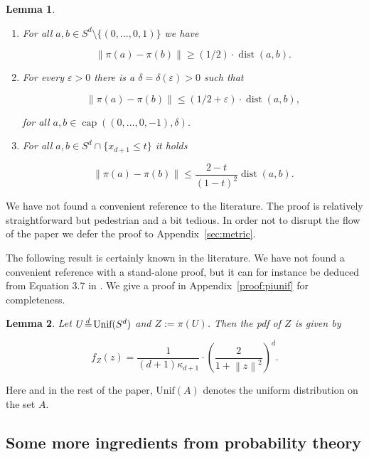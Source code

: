 \documentclass[11pt]{article}%
\newtheorem{lemma}[lemma]{Lemma}
\newcommand{\norm}[1]{\ensuremath{\left\|#1\right\|}}
\newcommand{\isd}[0]{\hspace{.2ex} \raisebox{-.1ex}{$=$} \hspace{-1.5ex} 
\raisebox{1ex}{{$\scriptstyle d$}} \hspace{.8ex} }
\newcommand{\eps}{\varepsilon}
\DeclareMathOperator{\dist}{dist}
\DeclareMathOperator{\kap}{cap}
\begin{document}
\begin{lemma}\label{lem:metric}
$\text{ }$
\begin{enumerate}
 \item\label{itm:metricgenlb} For all $a, b \in S^d \setminus \{(0,\dots,0,1)\}$ we have 
 
 $$ \norm{\pi(a)-\pi(b)} \geq (1/2) \cdot \dist(a,b). $$
 
 \item\label{itm:metricub12} For every $\eps > 0$ there is a $\delta=\delta(\eps) > 0$ such that 
 
 $$ \norm{\pi(a)-\pi(b)} \leq (1/2+\eps)\cdot \dist(a,b), $$
 
 \noindent 
 for all $a,b \in \kap( (0,\dots,0,-1), \delta)$.
 
 \item\label{itm:metricgenub} For all $a, b \in S^d \cap \{x_{d+1} \leq t\}$ it holds
 
 $$ \norm{\pi(a)-\pi(b)} \leq \frac{2-t}{(1-t)^2} \dist(a,b). $$
 
\end{enumerate}
\end{lemma}


\noindent
We have not found a convenient reference to the literature.
The proof is relatively straightforward but pedestrian and a bit tedious. In order not to disrupt the flow of the paper
we defer the proof to Appendix~\ref{sec:metric}.

The following result is certainly known in the literature. 
We have not found a convenient reference with a stand-alone proof, but it can for instance be deduced 
from Equation 3.7 in \cite{lee2006riemannian}. 
We give a proof in Appendix~\ref{proof:piunif} for completeness.  

\begin{lemma}\label{lem:piunif}
Let $U \isd \text{Unif}(S^d)$ and $Z := \pi(U)$.
Then the pdf of $Z$ is given by

$$ f_Z(z) = \frac{1}{(d+1)\kappa_{d+1}} \cdot \left(\frac{2}{1+\norm{z}^2}\right)^d. $$

\end{lemma}

\noindent
Here and in the rest of the paper, $\text{Unif}(A)$ denotes the uniform distribution on the set $A$.



\subsection{Some more ingredients from probability theory}
\end{document}
